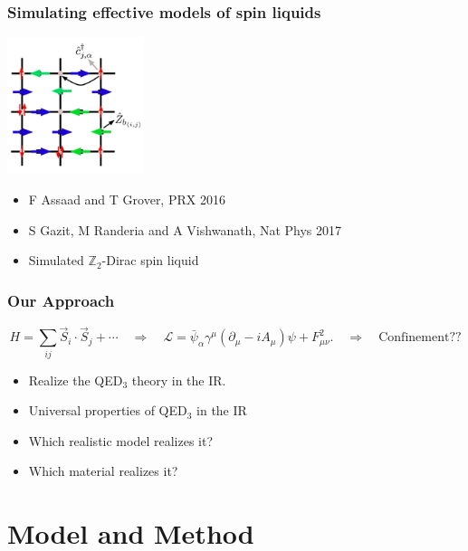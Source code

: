 \documentclass[xcolor=table, 10pt, aspectratio=169]{beamer}
\begin{document}
\begin{frame}
	\frametitle{Simulating effective models of spin liquids}
		\begin{center}
			\includegraphics[width=4cm]{../orthogonal_metal/z2dsl}
		\end{center}
		\begin{itemize}
			\item F Assaad and T Grover, PRX 2016
			\item S Gazit, M Randeria and A Vishwanath, Nat Phys 2017
			\item Simulated $\mathbb Z_2$-Dirac spin liquid
		\end{itemize}
\end{frame}

\begin{frame}
	\frametitle{Our Approach}
	\[H = \sum_{ij}\vec S_i\cdot\vec S_j+\cdots
	\quad\Rightarrow\quad
	\mathcal L = \bar\psi_\alpha \gamma^\mu(\partial_\mu-iA_\mu)\psi
	+ F_{\mu\nu}^2.
	\quad\Rightarrow\quad\text{Confinement??}\]
	\begin{itemize}
		\item[\ding{51}] Realize the QED$_3$ theory in the IR.
		\item[\ding{51}] Universal properties of QED$_3$ in the IR
		\item[\ding{55}] Which realistic model realizes it?
		\item[\ding{55}] Which material realizes it?
	\end{itemize}
\end{frame}

\section{Model and Method}
\end{document}
